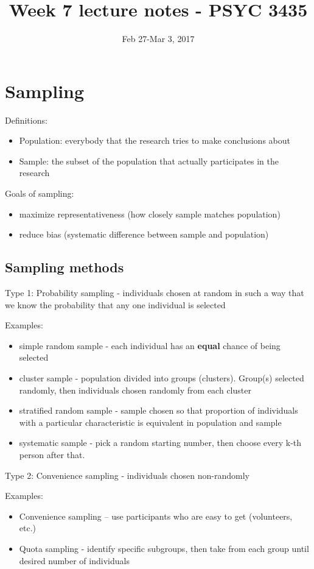 \documentclass[11pt]{article}
\date{Feb 27-Mar 3, 2017}
\title{Week 7 lecture notes - PSYC 3435}
\begin{document}
\maketitle

\section*{Sampling}
\label{sec-1}

Definitions:
\begin{itemize}
\item Population: everybody that the research tries to make conclusions about
\item Sample: the subset of the population that actually participates in the research
\end{itemize}

Goals of sampling:
\begin{itemize}
\item maximize representativeness (how closely sample matches population)
\item reduce bias (systematic difference between sample and population)
\end{itemize}

\subsection*{Sampling methods}
\label{sec-1-1}
Type 1: Probability sampling - individuals chosen at random in such a way that we know the probability that any one individual is selected

Examples:
\begin{itemize}
\item simple random sample - each individual has an \textbf{equal} chance of being selected
\item cluster sample - population divided into groups (clusters). Group(s) selected randomly, then individuals chosen randomly from each cluster
\item stratified random sample - sample chosen so that proportion of individuals with a particular characteristic is equivalent in population and sample
\item systematic sample - pick a random starting number, then choose every k-th person after that.
\end{itemize}

Type 2: Convenience sampling - individuals chosen non-randomly

Examples: 
\begin{itemize}
\item Convenience sampling -- use participants who are easy to get (volunteers, etc.)
\item Quota sampling - identify specific subgroups, then take from each group until desired number of individuals
\end{itemize}
\end{document}
